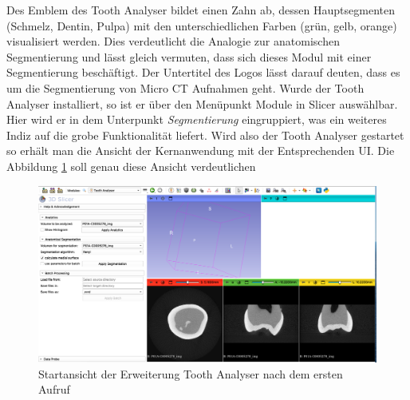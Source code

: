 Des Emblem des Tooth Analyser bildet einen Zahn ab, dessen Hauptsegmenten (Schmelz,
Dentin, Pulpa) mit den unterschiedlichen Farben (grün, gelb, orange) visualisiert
werden. Dies verdeutlicht die Analogie zur anatomischen Segmentierung und lässt
gleich vermuten, dass sich dieses Modul mit einer Segmentierung beschäftigt. Der
Untertitel des Logos lässt darauf deuten, dass es um die Segmentierung von Micro
\ac{CT} Aufnahmen geht. Wurde der Tooth Analyser installiert, so ist er über den
Menüpunkt Module in Slicer auswählbar. Hier wird er in dem Unterpunkt \textit{Segmentierung}
eingruppiert, was ein weiteres Indiz auf die grobe Funktionalität liefert. Wird
also der Tooth Analyser gestartet so erhält man die Ansicht der Kernanwendung
mit der Entsprechenden \ac{UI}. Die Abbildung \ref{fig:tooth_analyser_start_up}
soll genau diese Ansicht verdeutlichen

\begin{figure}[h]
	\centering
	\includegraphics[scale=0.2, width=\textwidth]{img/toothAnalyserStarUp.png}
	\caption{Startansicht der Erweiterung Tooth Analyser nach dem ersten Aufruf}
	\label{fig:tooth_analyser_start_up}
\end{figure}

